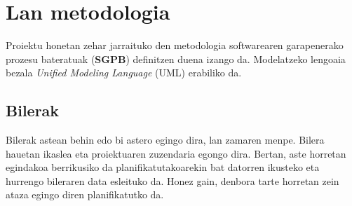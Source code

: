 \section{Lan metodologia}
Proiektu honetan zehar jarraituko den metodologia softwarearen garapenerako prozesu bateratuak (\textbf{SGPB}) definitzen duena izango da. Modelatzeko lengoaia bezala \textit{Unified Modeling Language} (UML) erabiliko da.
\subsection{Bilerak}
Bilerak astean behin edo bi astero egingo dira, lan zamaren menpe. Bilera hauetan ikaslea eta proiektuaren zuzendaria egongo dira. Bertan, aste horretan egindakoa berrikusiko da planifikatutakoarekin bat datorren ikusteko eta hurrengo bileraren data esleituko da. Honez gain, denbora tarte horretan zein ataza egingo diren planifikatutko da.
